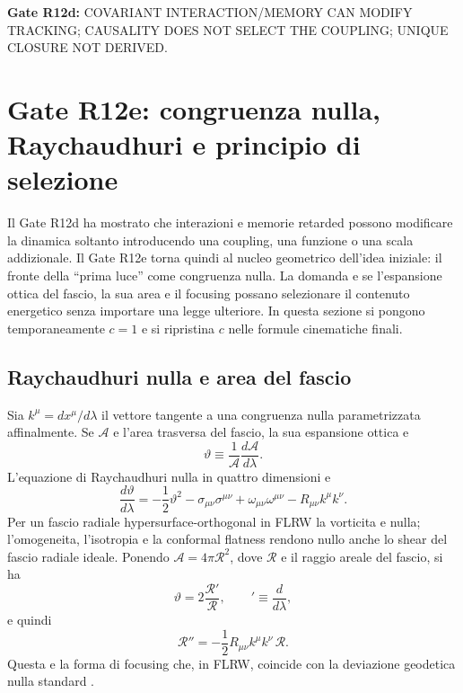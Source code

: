 \documentclass[11pt,a4paper]{article}
\newcommand{\status}[1]{\textsf{#1}}
\begin{document}
\textbf{Gate R12d:} \status{COVARIANT INTERACTION/MEMORY CAN MODIFY TRACKING; CAUSALITY DOES NOT SELECT THE COUPLING; UNIQUE CLOSURE NOT DERIVED}.


\section{Gate R12e: congruenza nulla, Raychaudhuri e principio di selezione}

Il Gate R12d ha mostrato che interazioni e memorie retarded possono modificare la dinamica soltanto introducendo una coupling, una funzione o una scala addizionale. Il Gate R12e torna quindi al nucleo geometrico dell'idea iniziale: il fronte della ``prima luce'' come congruenza nulla. La domanda e se l'espansione ottica del fascio, la sua area e il focusing possano selezionare il contenuto energetico senza importare una legge ulteriore. In questa sezione si pongono temporaneamente $c=1$ e si ripristina $c$ nelle formule cinematiche finali.

\subsection{Raychaudhuri nulla e area del fascio}

Sia $k^\mu=dx^\mu/d\lambda$ il vettore tangente a una congruenza nulla parametrizzata affinalmente. Se $\mathcal A$ e l'area trasversa del fascio, la sua espansione ottica e
\begin{equation}
 \vartheta\equiv\frac{1}{\mathcal A}\frac{d\mathcal A}{d\lambda}.
 \label{eq:r12e_theta_def}
\end{equation}
L'equazione di Raychaudhuri nulla in quattro dimensioni e
\begin{equation}
 \frac{d\vartheta}{d\lambda}
 =-\frac12\vartheta^2-\sigma_{\mu\nu}\sigma^{\mu\nu}
 +\omega_{\mu\nu}\omega^{\mu\nu}
 -R_{\mu\nu}k^\mu k^\nu.
 \label{eq:r12e_null_raychaudhuri}
\end{equation}
Per un fascio radiale hypersurface-orthogonal in FLRW la vorticita e nulla; l'omogeneita, l'isotropia e la conformal flatness rendono nullo anche lo shear del fascio radiale ideale. Ponendo $\mathcal A=4\pi\mathcal R^2$, dove $\mathcal R$ e il raggio areale del fascio, si ha
\begin{equation}
 \vartheta=2\frac{\mathcal R'}{\mathcal R},
 \qquad{}'\equiv\frac{d}{d\lambda},
\end{equation}
e quindi
\begin{equation}
 \boxed{\quad
 \mathcal R''=-\frac12 R_{\mu\nu}k^\mu k^\nu\,\mathcal R.
 \quad}
 \label{eq:r12e_optical_radius}
\end{equation}
Questa e la forma di focusing che, in FLRW, coincide con la deviazione geodetica nulla standard \cite{EllisVanElst1997}.
\end{document}
